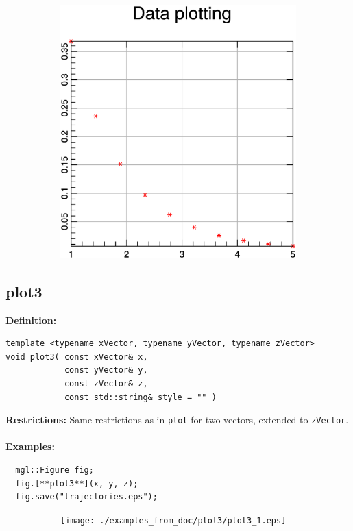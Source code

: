 \documentclass[a4paper]{article}
\newcommand{\command}[1]{\subsection{#1}}
\begin{document}
\begin{figure}[h]
\begin{subfigure}[hb]{.32\linewidth}
  \end{subfigure}
    \hfill
  \begin{subfigure}[hb]{.32\linewidth}
    \includegraphics[width=\textwidth]{./examples_from_doc/plot/plot_3.eps}
  \end{subfigure}
\end{figure}


\command{plot3}

\textbf{Definition:}
\begin{lstlisting}
template <typename xVector, typename yVector, typename zVector>
void plot3( const xVector& x,
            const yVector& y,
            const zVector& z,
            const std::string& style = "" )
\end{lstlisting}
\textbf{Restrictions:} Same restrictions as in \texttt{plot} for two vectors, extended to \texttt{zVector}. \\ \\
%
\textbf{Examples:}
\begin{lstlisting}
  mgl::Figure fig;
  fig.[**plot3**](x, y, z);
  fig.save("trajectories.eps");
\end{lstlisting}

\begin{figure}[h]
  \centering
  \begin{subfigure}[hb]{0.45\linewidth}
    \texttt{[image: ./examples\_from\_doc/plot3/plot3\_1.eps]}
  \end{subfigure}
\end{figure}
  
\end{document}
